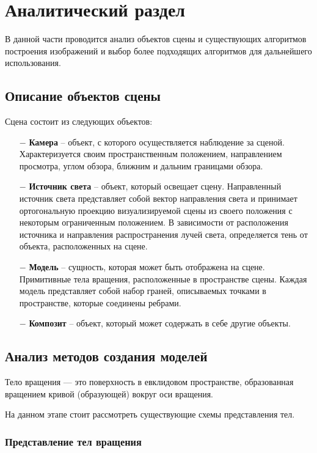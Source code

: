 \section{Аналитический раздел}

В данной части проводится анализ объектов сцены и существующих
алгоритмов построения изображений и выбор более подходящих алгоритмов
для дальнейшего использования.
\subsection{Описание объектов сцены}

Сцена состоит из следующих объектов:
\begin{itemize}
    \item[$-$] \textbf{Камера} -- объект, с которого осуществляется наблюдение за сценой. Характеризуется своим пространственным положением, направлением просмотра, углом обзора, ближним и дальним границами обзора.
    \item[$-$] \textbf{Источник света} -- объект, который освещает сцену. Направленный источник света представляет собой вектор направления света и принимает ортогональную проекцию визуализируемой сцены из своего положения с некоторым ограниченным положением. 
В зависимости от расположения источника и направления распространения лучей света, определяется тень от объекта, расположенных на сцене.
    \item[$-$] \textbf{Модель} -- сущность, которая может быть отображена на сцене. Примитивные тела вращения, расположенные в пространстве сцены. Каждая модель представляет собой набор граней, описываемых точками в пространстве, которые соединены ребрами.
    \item[$-$] \textbf{Композит} -- объект, который может содержать в себе другие объекты.
\end{itemize}

\subsection{Анализ методов создания моделей}
Тело вращения — это поверхность в евклидовом пространстве,
образованная вращением кривой (образующей) вокруг оси вращения.\cite{revolution}

На данном этапе стоит рассмотреть существующие схемы представления тел.

\subsubsection{Представление тел вращения}

